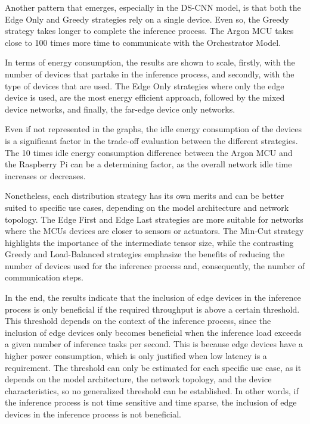 Another pattern that emerges, especially in the \ac{DS-CNN} model, is that both
the Edge Only and Greedy strategies rely on a single device. Even so, the Greedy
strategy takes longer to complete the inference process. The Argon \ac{MCU} takes
close to 100 times more time to communicate with the Orchestrator Model.

In terms of energy consumption, the results are shown to scale, firstly, with the
number of devices that partake in the inference process, and secondly, with the
type of devices that are used. The Edge Only strategies where only the edge device is 
used, are the most energy efficient approach, followed by the mixed device networks, 
and finally, the far-edge device only networks.

Even if not represented in the graphs, the idle energy consumption of the devices is a
significant factor in the trade-off evaluation between the different strategies. The 10 
times idle energy consumption difference between the Argon \ac{MCU} and the Raspberry 
Pi can be a determining factor, as the overall network idle time increases or decreases.  

Nonetheless, each distribution strategy has its own merits and can be better suited to
specific use cases, depending on the model architecture and network topology. The Edge
First and Edge Last strategies are more suitable for networks where the \acp{MCU}
devices are closer to sensors or actuators. The Min-Cut strategy highlights the
importance of the intermediate tensor size, while the contrasting Greedy and 
Load-Balanced strategies emphasize the benefits of reducing the number of devices 
used for the inference process and, consequently, the number of communication steps.

In the end, the results indicate that the inclusion of edge devices in the inference
process is only beneficial if the required throughput is above a certain threshold.
This threshold depends on the context of the inference process, since the inclusion of
edge devices only becomes beneficial when the inference load exceeds a given number of
inference tasks per second. This is because edge devices have a higher power
consumption, which is only justified when low latency is a
requirement. The threshold can only be estimated for each specific use case, as it
depends on the model architecture, the network topology, and the device
characteristics, so no generalized threshold can be established. 
In other words, if the inference process is not time sensitive and time sparse, the 
inclusion of edge devices in the inference process is not beneficial.

